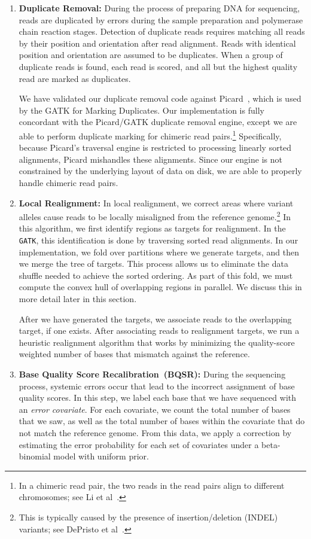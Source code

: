 \documentclass[masters]{ucbthesis}
\begin{document}
\begin{enumerate}
\item \textbf{Duplicate Removal:} During the process of preparing DNA for sequencing, reads are duplicated by
errors during the sample preparation and polymerase chain reaction stages. Detection of duplicate reads
requires matching all reads by their position and orientation after read alignment. Reads with identical position
and orientation are assumed to be duplicates. When a group of duplicate reads is found, each read is scored,
and all but the highest quality read are marked as duplicates.

We have validated our duplicate removal code against Picard~\cite{picard}, which is used by the GATK
for Marking Duplicates. Our implementation is fully concordant with the Picard/GATK duplicate removal
engine, except we are able to perform duplicate marking for chimeric read pairs.\footnote{In a chimeric read pair,
the two reads in the read pairs align to different chromosomes; see Li et al~\cite{li10}.}
Specifically, because Picard's traversal engine is restricted to processing linearly sorted alignments,
Picard mishandles these alignments. Since our engine is not constrained by the underlying layout of data
on disk, we are able to properly handle chimeric read pairs.
\item \textbf{Local Realignment:} In local realignment, we correct areas where variant alleles cause reads to be
locally misaligned from the reference genome.\footnote{This is typically caused by the presence of
insertion/deletion (INDEL) variants; see DePristo et al~\cite{depristo11}.} In this algorithm, we first identify regions
as targets for realignment. In the \texttt{GATK}, this identification is done by traversing sorted read alignments. In our implementation,
we fold over partitions where we generate targets, and then we merge the tree of targets. This process allows us
to eliminate the data shuffle needed to achieve the sorted ordering. As part of this fold, we must
compute the convex hull of overlapping regions in parallel. We discuss this in more detail later in this section.

After we have generated the targets, we associate reads to the overlapping target, if one exists. After
associating reads to realignment targets, we run a heuristic realignment algorithm that works by minimizing
the quality-score weighted number of bases that mismatch against the reference.
\item \textbf{Base Quality Score Recalibration~(BQSR):} During the sequencing process, systemic errors occur
that lead to the incorrect assignment of base quality scores. In this step, we label each base that we have
sequenced with an \emph{error covariate}. For each covariate, we count the total number of bases that we saw,
as well as the total number of bases within the covariate that do not match the reference genome. From this data, 
we apply a correction by estimating the error probability for each set of covariates under a beta-binomial model
with uniform prior.


\end{enumerate}
\end{document}
